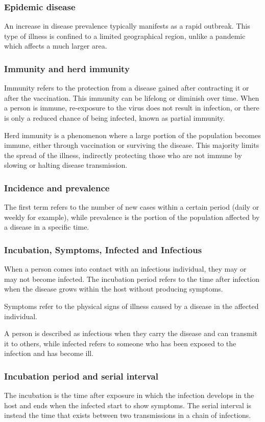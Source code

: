 \subsubsection{Epidemic disease} An increase in disease prevalence typically manifests as a rapid outbreak. This type of illness is confined to a limited geographical region, unlike a pandemic which affects a much larger area.

\subsubsection{Immunity and herd immunity}
Immunity refers to the protection from a disease gained after contracting it or after the vaccination. This immunity can be lifelong or diminish over time. When a person is immune, re-exposure to the virus does not result in infection, or there is only a reduced chance of being infected, known as partial immunity.

Herd immunity is a phenomenon where a large portion of the population becomes immune, either through vaccination or surviving the disease. This majority limits the spread of the illness, indirectly protecting those who are not immune by slowing or halting disease transmission.

\subsubsection{Incidence and prevalence} The first term refers to the number of new cases within a certain period (daily or weekly for example), while prevalence is the portion of the population affected by a disease in a specific time.

\subsubsection{Incubation, Symptoms, Infected and Infectious}  When a person comes into contact with an infectious individual, they may or may not become infected. The incubation period refers to the time after infection when the disease grows within the host without producing symptoms.

Symptoms refer to the physical signs of illness caused by a disease in the affected individual.

A person is described as infectious when they carry the disease and can transmit it to others, while infected refers to someone who has been exposed to the infection and has become ill.

\subsubsection{Incubation period and serial interval} The incubation is the time after exposure in which the infection develops in the host and ends when the infected start to show symptoms. The serial interval is instead the time that exists between two transmissions in a chain of infections. 



